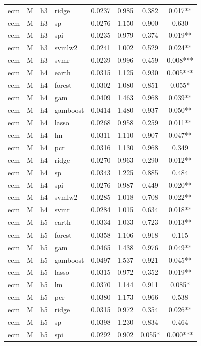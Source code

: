 \begin{ThreePartTable}
\begin{longtable}[t]{llclcccc}
ecm & M & h3 & ridge & 0.0237 & 0.985 & 0.382 & 0.017**\\
ecm & M & h3 & sp & 0.0276 & 1.150 & 0.900 & 0.630\\
ecm & M & h3 & spi & 0.0235 & 0.979 & 0.374 & 0.019**\\
ecm & M & h3 & svmlw2 & 0.0241 & 1.002 & 0.529 & 0.024**\\
ecm & M & h3 & svmr & 0.0239 & 0.996 & 0.459 & 0.008***\\
\addlinespace
ecm & M & h4 & earth & 0.0315 & 1.125 & 0.930 & 0.005***\\
ecm & M & h4 & forest & 0.0302 & 1.080 & 0.851 & 0.055*\\
ecm & M & h4 & gam & 0.0409 & 1.463 & 0.968 & 0.039**\\
ecm & M & h4 & gamboost & 0.0414 & 1.480 & 0.937 & 0.050**\\
ecm & M & h4 & lasso & 0.0268 & 0.958 & 0.259 & 0.011**\\
ecm & M & h4 & lm & 0.0311 & 1.110 & 0.907 & 0.047**\\
ecm & M & h4 & pcr & 0.0316 & 1.130 & 0.968 & 0.349\\
ecm & M & h4 & ridge & 0.0270 & 0.963 & 0.290 & 0.012**\\
ecm & M & h4 & sp & 0.0343 & 1.225 & 0.885 & 0.484\\
ecm & M & h4 & spi & 0.0276 & 0.987 & 0.449 & 0.020**\\
ecm & M & h4 & svmlw2 & 0.0285 & 1.018 & 0.708 & 0.022**\\
ecm & M & h4 & svmr & 0.0284 & 1.015 & 0.634 & 0.018**\\
\addlinespace
ecm & M & h5 & earth & 0.0334 & 1.033 & 0.723 & 0.013**\\
ecm & M & h5 & forest & 0.0358 & 1.106 & 0.918 & 0.115\\
ecm & M & h5 & gam & 0.0465 & 1.438 & 0.976 & 0.049**\\
ecm & M & h5 & gamboost & 0.0497 & 1.537 & 0.921 & 0.045**\\
ecm & M & h5 & lasso & 0.0315 & 0.972 & 0.352 & 0.019**\\
ecm & M & h5 & lm & 0.0370 & 1.144 & 0.911 & 0.085*\\
ecm & M & h5 & pcr & 0.0380 & 1.173 & 0.966 & 0.538\\
ecm & M & h5 & ridge & 0.0315 & 0.972 & 0.354 & 0.026**\\
ecm & M & h5 & sp & 0.0398 & 1.230 & 0.834 & 0.464\\
ecm & M & h5 & spi & 0.0292 & 0.902 & 0.055* & 0.000***\\

\end{longtable}
\end{ThreePartTable}
